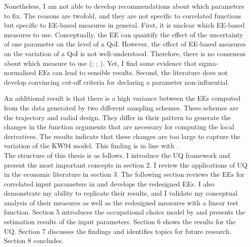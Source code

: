 Nonetheless, I am not able to develop recommendations about which parameters to fix. The reasons are twofold, and they are not specific to correlated functions but specific to EE-based measures in general. First, it is unclear which EE-based measures to use. Conceptually, the EE can quantify the effect of the uncertainty of one parameter on the level of a QoI. However, the effect of EE-based measures on the variation of a QoI is not well-understood. Therefore, there is no consensus about which measure to use (\cite{campolongo2007effective}; \cite{kucherenko2009derivative}; \cite{Smith.2014}). Yet, I find some evidence that sigma-normalised EEs can lead to sensible results.
Second, the literature does not develop convincing cut-off criteria for declaring a parameter non-influential.

An additional result is that there is a high variance between the EEs computed from the data generated by two different sampling schemes. These schemes are the trajectory and radial design. They differ in their pattern to generate the changes in the function arguments that are necessary for computing the local derivatives. The results indicate that these changes are too large to capture the variation of the KW94 model. This finding is in line with \cite{kucherenko2009derivative}.\\

\noindent
The structure of this thesis is as follows. I introduce the UQ framework and present the most important concepts in section 2. I review the applications of UQ in the economic literature in section 3. The following section reviews the EEs for correlated input parameters in \cite{ge2017extending} and develops the redesigned EEs. I also demonstrate my ability to replicate their results, and I validate my conceptual analysis of their measures as well as the redesigned measures with a linear test function. Section 5 introduces the occupational choice model by \cite{Keane.1994} and presents the estimation results of the input parameters. Section 6 shows the results for the UQ. Section 7 discusses the findings and identifies topics for future research. Section 8 concludes.





